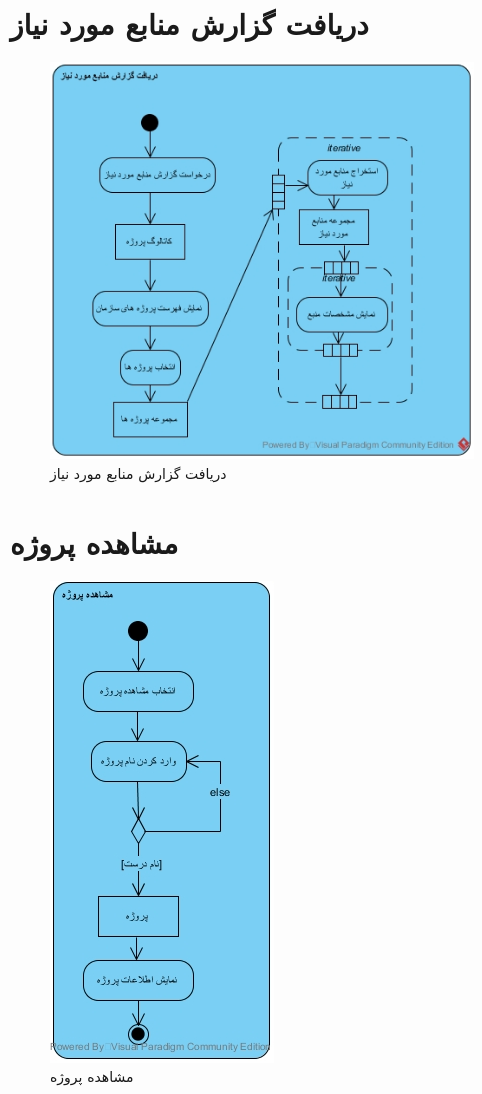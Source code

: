\section{دریافت گزارش منابع مورد نیاز}
\begin{figure}[H]
	\centering
	\includegraphics[scale=0.8]{img/activity/repneeded}
	\caption{دریافت گزارش منابع مورد نیاز}
\end{figure}

\section{مشاهده پروژه}
\begin{figure}[H]
	\centering
	\includegraphics[scale=0.8]{img/activity/viewprj}
	\caption{مشاهده پروژه}
\end{figure}


